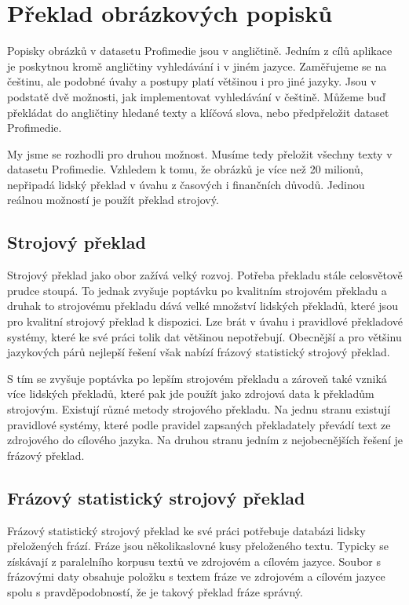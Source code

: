 \chapter{Překlad obrázkových popisků}

Popisky obrázků v datasetu Profimedie jsou v angličtině. Jedním z cílů aplikace je poskytnou kromě angličtiny vyhledávání i v jiném jazyce. Zaměřujeme se na češtinu, ale podobné úvahy a postupy platí většinou i pro jiné jazyky. Jsou v podstatě dvě možnosti, jak implementovat vyhledávání v češtině. Můžeme buď překládat do angličtiny hledané texty a klíčová slova, nebo předpřeložit dataset Profimedie.

My jsme se rozhodli pro druhou možnost. Musíme tedy přeložit všechny texty v datasetu Profimedie. Vzhledem k tomu, že obrázků je více než 20 milionů, nepřipadá lidský překlad v úvahu z časových i finančních důvodů. Jedinou reálnou možností je použít překlad strojový.

\section{Strojový překlad}

Strojový překlad jako obor zažívá velký rozvoj. Potřeba překladu stále celosvětově prudce stoupá. To jednak zvyšuje poptávku po kvalitním strojovém překladu a druhak to strojovému překladu dává velké množství lidských překladů, které jsou pro kvalitní strojový překlad k dispozici. Lze brát v úvahu i pravidlové překladové systémy, které ke své práci tolik dat většinou nepotřebují. Obecnější a pro většinu jazykových párů nejlepší řešení však nabízí frázový statistický strojový překlad.


S tím se zvyšuje poptávka po lepším strojovém překladu a zároveň také vzniká více lidských překladů, které pak jde použít jako zdrojová data k překladům strojovým. Existují různé metody strojového překladu. Na jednu stranu existují pravidlové systémy, které podle pravidel zapsaných překladately převádí text ze zdrojového do cílového jazyka. Na druhou stranu jedním z nejobecnějších řešení je frázový překlad.

\section{Frázový statistický strojový překlad}

 Frázový statistický strojový překlad\cite{koehn} ke své práci potřebuje databázi lidsky přeložených frází. Fráze jsou několikaslovné kusy přeloženého textu. Typicky se získávají z paralelního korpusu textů ve zdrojovém a cílovém jazyce. Soubor s frázovými daty obsahuje položku s textem fráze ve zdrojovém a cílovém jazyce spolu s pravděpodobností, že je takový překlad fráze správný.

